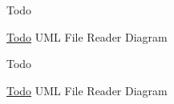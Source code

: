 \begin{DoxyRefDesc}{Todo}
\item[\hyperlink{todo__todo000002}{Todo}]U\-M\-L File Reader Diagram\end{DoxyRefDesc}


\begin{DoxyRefDesc}{Todo}
\item[\hyperlink{todo__todo000010}{Todo}]U\-M\-L File Reader Diagram\end{DoxyRefDesc}
